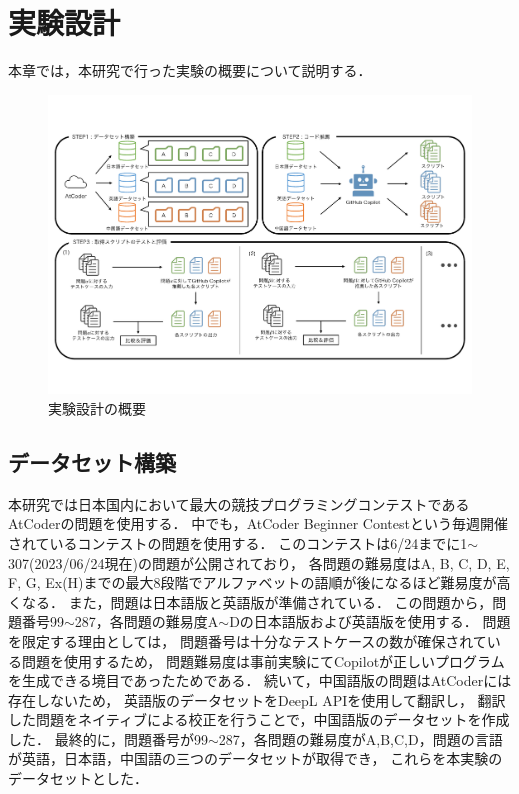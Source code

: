 \section{実験設計\label{approach}}
  本章では，本研究で行った実験の概要について説明する．
  \begin{figure}[t]
    \centering
    \includegraphics[width=\linewidth]{image/system.pdf}
    \caption{実験設計の概要}
    \label{experiment_design}
  \end{figure}
  
  \subsection{データセット構築\label{build_dataset}}
    本研究では日本国内において最大の競技プログラミングコンテストであるAtCoderの問題を使用する．
    中でも，AtCoder Beginner Contestという毎週開催されているコンテストの問題を使用する．
    このコンテストは6/24までに1${\sim}$307(2023/06/24現在)の問題が公開されており，
    各問題の難易度はA, B, C, D, E, F, G, Ex(H)までの最大8段階でアルファベットの語順が後になるほど難易度が高くなる．
    また，問題は日本語版と英語版が準備されている．
    この問題から，問題番号99${\sim}$287，各問題の難易度A${\sim}$Dの日本語版および英語版を使用する．
    問題を限定する理由としては，
    問題番号は十分なテストケースの数が確保されている問題を使用するため，
    問題難易度は事前実験にてCopilotが正しいプログラムを生成できる境目であったためである．
    続いて，中国語版の問題はAtCoderには存在しないため，
    英語版のデータセットをDeepL APIを使用して翻訳し，
    翻訳した問題をネイティブによる校正を行うことで，中国語版のデータセットを作成した．
    最終的に，問題番号が99${\sim}$287，各問題の難易度がA,B,C,D，問題の言語が英語，日本語，中国語の三つのデータセットが取得でき，
    これらを本実験のデータセットとした．

